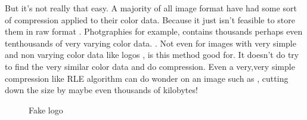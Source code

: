 \begin{refsection}
  But it's not really that easy. A majority of all image format have
  had some sort of compression applied to their color data. Because it
  just isn't feasible to store them in raw format . Photgraphies for example, contains thousands perhaps even
  tenthousands of very varying color data. . Not even for images with very simple
  and non varying color data like logos , is this
  method good for. It doesn't do try to find the very similar color
  data and do compression. Even a very,very simple compression like RLE
  algorithm can do wonder on an image such as ,
  cutting down the size by maybe even thousands of kilobytes!


  \begin{figure}[h!]
    \centering
    \newcommand{\shieldcolor}{red}
    \caption{Fake logo}
    \label{fig:logo}
  \end{figure}

  \printbibliography[heading=subbibliography]

\end{refsection}